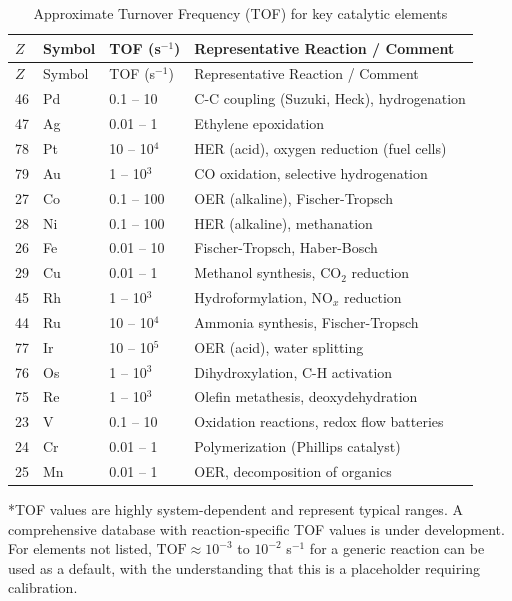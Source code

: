 \documentclass[12pt,a4paper]{article}
\begin{document}
	\begin{longtable}{p{1.2cm}p{1.2cm}p{3.0cm}p{6.5cm}}
		\caption{Approximate Turnover Frequency (TOF) for key catalytic elements} \label{tab:tof-data} \\
		\toprule
		\(Z\) & Symbol & TOF (s\(^{-1}\)) & Representative Reaction / Comment \\
		\midrule
		\endfirsthead
		\toprule
		\(Z\) & Symbol & TOF (s\(^{-1}\)) & Representative Reaction / Comment \\
		\midrule
		\endhead
		46 & Pd & 0.1 – 10 & C-C coupling (Suzuki, Heck), hydrogenation \\
		47 & Ag & 0.01 – 1 & Ethylene epoxidation \\
		78 & Pt & 10 – 10\(^4\) & HER (acid), oxygen reduction (fuel cells) \\
		79 & Au & 1 – 10\(^3\) & CO oxidation, selective hydrogenation \\
		27 & Co & 0.1 – 100 & OER (alkaline), Fischer-Tropsch \\
		28 & Ni & 0.1 – 100 & HER (alkaline), methanation \\
		26 & Fe & 0.01 – 10 & Fischer-Tropsch, Haber-Bosch \\
		29 & Cu & 0.01 – 1 & Methanol synthesis, CO\(_2\) reduction \\
		45 & Rh & 1 – 10\(^3\) & Hydroformylation, NO\(_x\) reduction \\
		44 & Ru & 10 – 10\(^4\) & Ammonia synthesis, Fischer-Tropsch \\
		77 & Ir & 10 – 10\(^5\) & OER (acid), water splitting \\
		76 & Os & 1 – 10\(^3\) & Dihydroxylation, C-H activation \\
		75 & Re & 1 – 10\(^3\) & Olefin metathesis, deoxydehydration \\
		23 & V  & 0.1 – 10 & Oxidation reactions, redox flow batteries \\
		24 & Cr & 0.01 – 1 & Polymerization (Phillips catalyst) \\
		25 & Mn & 0.01 – 1 & OER, decomposition of organics \\
		\bottomrule
	\end{longtable}
	
	*TOF values are highly system-dependent and represent typical ranges. A comprehensive database with reaction-specific TOF values is under development. For elements not listed, \(\text{TOF} \approx 10^{-3}\) to \(10^{-2}\) s\(^{-1}\) for a generic reaction can be used as a default, with the understanding that this is a placeholder requiring calibration.
	
\end{document}

